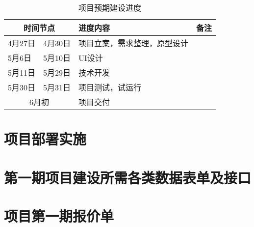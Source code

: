 \documentclass[12pt,a4paper,openany]{ctexrep}
\begin{document}
\begin{table}[htbp]
\begin{tabular*}{\hsize}{p{2.5cm}<{\centering}@{-}p{2.5cm}<{\centering}|p{7cm}|p{3cm}}
\hline
\multicolumn{2}{c|}{时间节点}		&	进度内容				&	备注	\\
\hline
4月27日		&	4月30日		&	项目立案，需求整理，原型设计		&			\\
5月6日		&	5月10日		&	UI设计								&			\\
5月11日		&	5月29日		&	技术开发							&			\\
5月30日		&	5月31日		&	项目测试，试运行					&			\\
\multicolumn{2}{c|}{6月初}			&	项目交付				&			\\		
\hline
\end{tabular*}
\caption{项目预期建设进度}
\label{schedule}
\end{table}

\chapter{项目部署实施}
\label{arrange}

\appendix							%

\chapter{第一期项目建设所需各类数据表单及接口}
\chapter{项目第一期报价单}


\end{document}
